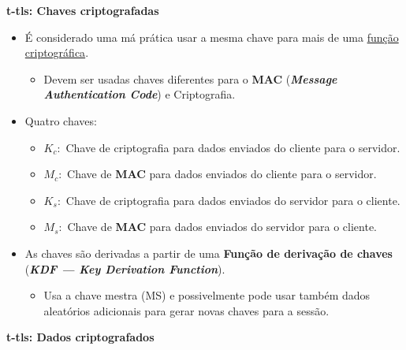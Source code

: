     \textbf{t-tls: Chaves criptografadas}
    
    \begin{itemize}[left=0.5cm, align=left, nosep]
        \item É considerado uma má prática usar a mesma chave para mais de uma \underline{função criptográfica}.
        \begin{itemize}[left=0.5cm, nosep, label=$\hookrightarrow$]
            \item Devem ser usadas chaves diferentes para o \textbf{MAC} (\textbf{\textit{Message Authentication Code}}) e Criptografia.
        \end{itemize}
        \item Quatro chaves:
        \begin{itemize}[left=0.5cm, nosep, label=$\hookrightarrow$]
            \item $K_c:$ Chave de criptografia para dados enviados do cliente para o servidor.
            \item $M_c:$ Chave de \textbf{MAC} para dados enviados do cliente para o servidor.
            \item $K_s:$ Chave de criptografia para dados enviados do servidor para o cliente.
            \item $M_s:$ Chave de \textbf{MAC} para dados enviados do servidor para o cliente.
        \end{itemize}
        \item As chaves são derivadas a partir de uma \textbf{Função de derivação de chaves} (\textbf{\textit{KDF — Key Derivation Function}}). 
        \begin{itemize}[left=0.5cm, nosep, label=$\hookrightarrow$]
            \item Usa a chave mestra (MS) e possivelmente pode usar também dados aleatórios adicionais para gerar novas chaves para a sessão.
        \end{itemize}
    \end{itemize}

    \textbf{t-tls: Dados criptografados}
    
